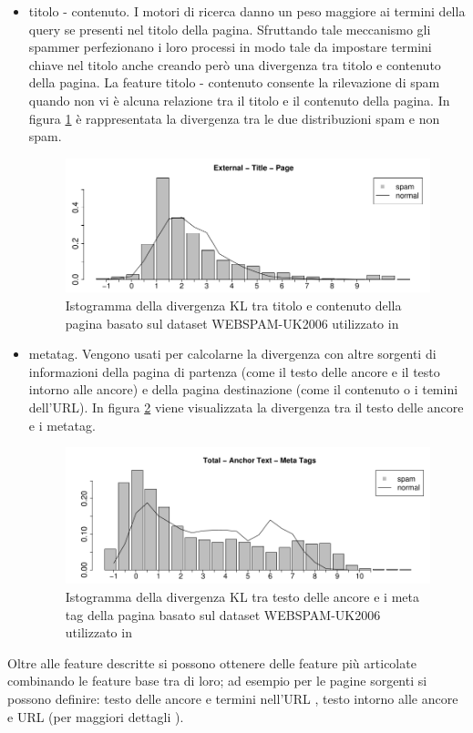 \begin{itemize}
\item titolo - contenuto. I motori di ricerca danno un peso maggiore ai termini della query se presenti nel titolo della pagina. Sfruttando tale meccanismo gli spammer perfezionano i loro processi in modo tale da impostare termini chiave nel titolo anche creando però una divergenza tra titolo e contenuto della pagina. La feature titolo - contenuto consente la rilevazione di spam quando non vi è alcuna relazione tra il titolo e il contenuto della pagina. In figura \ref{fig:martinez7} è rappresentata la divergenza tra le due distribuzioni spam e non spam. 
\begin{figure}[htbp]
\centering
\includegraphics[width=12cm]{immagini/martinez/martinez7}
\caption{Istogramma della divergenza KL tra titolo  e contenuto della pagina basato sul dataset WEBSPAM-UK2006 utilizzato in \cite{Martinez-Romo:2009:WSI:1531914.1531920}}
\label{fig:martinez7}
\end{figure}

\item metatag. Vengono usati per calcolarne la divergenza con altre sorgenti di informazioni della pagina di partenza (come il testo delle ancore e il testo intorno alle ancore) e della pagina destinazione (come il contenuto o i temini dell'URL). In figura \ref{fig:martinez8} viene visualizzata la divergenza tra il testo delle ancore e i metatag.
\begin{figure}[htbp]
\centering
\includegraphics[width=12cm]{immagini/martinez/martinez8}
\caption{Istogramma della divergenza KL tra testo delle ancore  e i meta tag della pagina basato sul dataset WEBSPAM-UK2006 utilizzato in \cite{Martinez-Romo:2009:WSI:1531914.1531920}}
\label{fig:martinez8}
\end{figure}
\end{itemize}
Oltre alle feature descritte si possono ottenere delle feature più articolate combinando le feature base tra di loro; ad esempio per le pagine sorgenti si possono definire: testo delle ancore e termini nell'URL , testo intorno alle ancore e URL (per maggiori dettagli \cite{Martinez-Romo:2009:WSI:1531914.1531920}).

